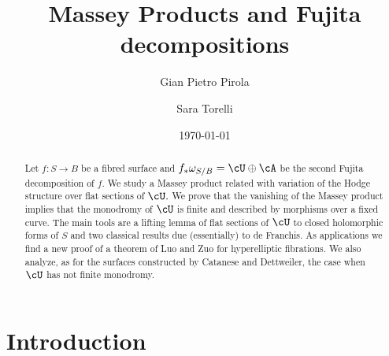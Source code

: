 \documentclass[a4paper,11pt]{amsart}
\title{Massey Products and Fujita decompositions }
\author[P. Pirola]{Gian Pietro Pirola}
\author[S. Torelli]{Sara Torelli}
\date{\today}
\newtheorem{theorem}{Theorem}[section]
\begin{document}
	
	
	\maketitle
	
	\bigskip
	\begin{abstract} Let $f:S\to B$ be a fibred surface and $f_\ast\omega_{S/B}=\cU\oplus \cA$ be the second Fujita decomposition of $f.$ We study  a Massey product related with variation of the Hodge structure over flat sections of $\cU.$ We prove that the vanishing of the Massey product implies that the monodromy of $\cU$ is finite and  described by morphisms over a fixed curve.  The main tools are a lifting lemma of flat sections of $\cU$ to closed holomorphic forms of $S$ and two classical results due (essentially) to de Franchis.
 As applications we find a new proof of a theorem of Luo and Zuo for hyperelliptic fibrations. We  also analyze, as for the surfaces constructed by Catanese and Dettweiler, the case when $\cU$ has not finite monodromy.		
		\end{abstract}
		
	\section{Introduction}
	

	
	
\end{document}
